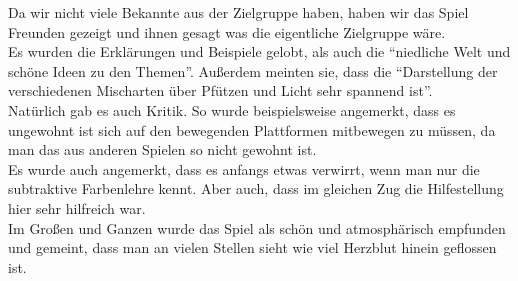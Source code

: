 \documentclass[10pt,a4paper,notitlepage]{report}
\begin{document}
	Da wir nicht viele Bekannte aus der Zielgruppe haben, haben wir das Spiel Freunden gezeigt und ihnen gesagt was die eigentliche Zielgruppe wäre.\\
	Es wurden die Erklärungen und Beispiele gelobt, als auch die \enquote{niedliche Welt und schöne Ideen zu den Themen}. Außerdem meinten sie, dass die \enquote{Darstellung der verschiedenen Mischarten über Pfützen und Licht sehr spannend ist}.\\
	Natürlich gab es auch Kritik. So wurde beispielsweise angemerkt, dass es ungewohnt ist sich auf den bewegenden Plattformen mitbewegen zu müssen, da man das aus anderen Spielen so nicht gewohnt ist.\\
	Es wurde auch angemerkt, dass es anfangs etwas verwirrt, wenn man nur die subtraktive Farbenlehre kennt. Aber auch, dass im gleichen Zug die Hilfestellung hier sehr hilfreich war.\\
	Im Großen und Ganzen wurde das Spiel als schön und atmosphärisch empfunden und gemeint, dass man an vielen Stellen sieht wie viel Herzblut hinein geflossen ist.\\
	
	\clearpage
	\marginpar{\vspace{3.0mm} \color{orange}\rule{0.8mm}{53.3mm} \\[3mm] \color{hellorange}\rule{0.8mm}{170mm}}
	\par\bigskip
	
\end{document}
